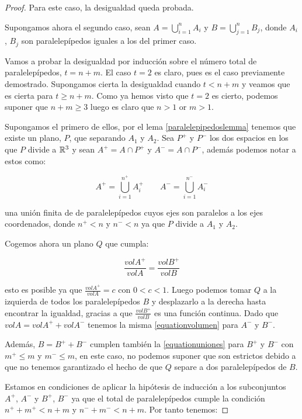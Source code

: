 \begin{proof}
Para este caso, la desigualdad queda probada.

Supongamos ahora el segundo caso, sean $A = \displaystyle\bigcup_{i=1}^n A_i$ y $B = \displaystyle\bigcup_{j=1}^n B_j$, donde $A_i$, $B_j$ son paralelepípedos iguales a los del primer caso.

Vamos a probar la desigualdad por inducción sobre el número total de paralelepípedos, $t = n + m$.
El caso $t=2$ es claro, pues es el caso previamente demostrado.
Supongamos cierta la desigualdad cuando $t < n + m$ y veamos que es cierta para $t \geq n + m$. Como ya hemos visto que $t=2$ es cierto, podemos suponer que $n + m \geq 3$ luego es claro que $n > 1$ or $m > 1$.

Supongamos el primero de ellos, por el lema \autoref{paralelepipedoslemma} tenemos que existe un plano, $P$, que separando $A_1$ y $A_2$. Sea $P^+$ y $P^-$ los dos espacios en los que $P$ divide a $\mathbb{R}^3$ y sean $A^+ = A \cap P^+$ y $A^- = A \cap P^-$, además podemos notar a estos como:

\begin{equation}\label{equationuniones}
    A^+ = \displaystyle\bigcup_{i=1}^{n^+} A_i^+ \qquad A^- = \displaystyle\bigcup_{i=1}^{n^-} A_i^-
\end{equation}

una unión finita de de paralelepípedos cuyos ejes son paralelos a los ejes coordenados, donde $n^+ < n$ y $n^- < n$ ya que $P$ divide a $A_1$ y $A_2$.

Cogemos ahora un plano $Q$ que cumpla:

\begin{equation}\label{equationvolumen}
    \frac{vol A^+}{vol A} = \frac{vol B^+}{vol B}
\end{equation}

esto es posible ya que $\frac{vol A^+}{vol A} = c$ con $0 < c < 1$. Luego podemos tomar $Q$ a la izquierda de todos los paralelepípedos $B$ y desplazarlo a la derecha hasta encontrar la igualdad, gracias a que $\frac{vol B^+}{vol B}$ es una función continua.
Dado que $vol A = vol A^+ + vol A^-$ tenemos la misma \autoref{equationvolumen} para $A^-$ y $B^-$.

Además, $B = B^+ + B^-$ cumplen también la \autoref{equationuniones} para $B^+$ y $B^-$ con $m^+ \leq m$ y $m^- \leq m$, en este caso, no podemos suponer que son estrictos debido a que no tenemos garantizado el hecho de que $Q$ separe a dos paralelepípedos de $B$.

Estamos en condiciones de aplicar la hipótesis de inducción a los subconjuntos $A^+$, $A^-$ y $B^+$, $B^-$ ya que el total de paralelepípedos cumple la condición $n^+ + m^+ < n + m$ y $n^- + m^- < n + m$. Por tanto tenemos:


\end{proof}
